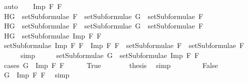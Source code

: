 \begin{isabellebody}
\ auto\isanewline
{}\isamarkupfalse%
\isanewline
\ \ \isamarkupfalse%
\ {\isacharparenleft}Imp\ F{}\ F{}{\isacharparenright}\isanewline
\ \ \isamarkupfalse%
\ H{}{\isacharcolon}{\isachardoublequoteopen}G\ {\isasymin}\ setSubformulae\ F{}\ {\isasymLongrightarrow}\ setSubformulae\ G\ {\isasymsubseteq}\ setSubformulae\ F{}{\isachardoublequoteclose}\isanewline
\ \ \isamarkupfalse%
\ H{}{\isacharcolon}{\isachardoublequoteopen}G\ {\isasymin}\ setSubformulae\ F{}\ {\isasymLongrightarrow}\ setSubformulae\ G\ {\isasymsubseteq}\ setSubformulae\ F{}{\isachardoublequoteclose}\isanewline
\ \ \isamarkupfalse%
\ H{}{\isacharcolon}{\isachardoublequoteopen}G\ {\isasymin}\ setSubformulae\ {\isacharparenleft}Imp\ F{}\ F{}{\isacharparenright}{\isachardoublequoteclose}\isanewline
\ \ \isamarkupfalse%
\ {}{\isacharcolon}{\isachardoublequoteopen}setSubformulae\ {\isacharparenleft}Imp\ F{}\ F{}{\isacharparenright}\ {\isacharequal}\ {\isacharbraceleft}Imp\ F{}\ F{}{\isacharbraceright}\ {\isasymunion}\ {\isacharparenleft}setSubformulae\ F{}\ {\isasymunion}\ setSubformulae\ F{}{\isacharparenright}{\isachardoublequoteclose}\ \isanewline
\ \ \ \ \isamarkupfalse%
\ simp\isanewline
\ \ \isamarkupfalse%
\ \isamarkupfalse%
\ {\isachardoublequoteopen}setSubformulae\ G\ {\isasymsubseteq}\ setSubformulae\ {\isacharparenleft}Imp\ F{}\ F{}{\isacharparenright}{\isachardoublequoteclose}\isanewline
\ \ \isamarkupfalse%
\ {\isacharparenleft}cases\ {\isachardoublequoteopen}G\ {\isacharequal}\ Imp\ F{}\ F{}{\isachardoublequoteclose}{\isacharparenright}\isanewline
\ \ \ \ \isamarkupfalse%
\ True\isanewline
\ \ \ \ \isamarkupfalse%
\ \isamarkupfalse%
\ {\isacharquery}thesis\ \isamarkupfalse%
\ simp\isanewline
\ \ \isamarkupfalse%
\isanewline
\ \ \ \ \isamarkupfalse%
\ False\isanewline
\ \ \ \ \isamarkupfalse%
\ \isamarkupfalse%
\ {}{\isacharcolon}{\isachardoublequoteopen}G\ {\isasymnoteq}\ Imp\ F{}\ F{}{\isachardoublequoteclose}\ \isamarkupfalse%
\ simp\isanewline
\ \ \ \ \isamarkupfalse%

\end{isabellebody}
